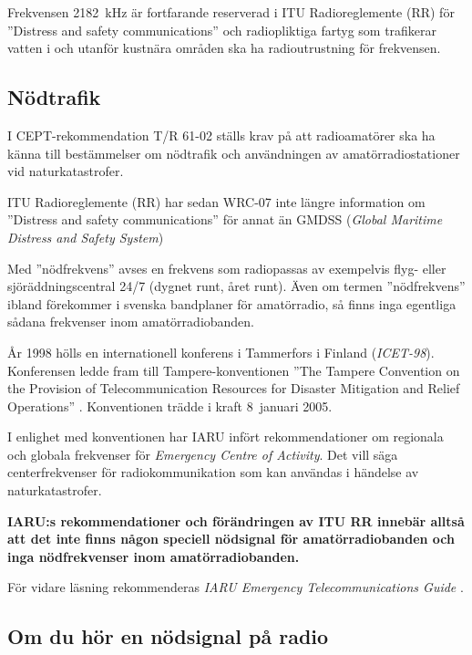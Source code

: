 Frekvensen 2182~kHz är fortfarande reserverad i ITU Radioreglemente (RR)
\cite{ITU-RR} för ''Distress and safety communications'' och radiopliktiga
fartyg som trafikerar vatten i och utanför kustnära områden ska ha
radioutrustning för frekvensen.

\subsection{Nödtrafik}
\label{nödtrafik}

I CEPT-rekommendation T/R 61-02 \cite{TR6102} ställs krav på att radioamatörer
ska ha känna till bestämmelser om nödtrafik och användningen av
amatörradiostationer vid naturkatastrofer.

ITU Radioreglemente (RR) \cite{ITU-RR} har sedan WRC-07 inte längre information
om ''Distress and safety communications'' för annat än
GMDSS (\emph{Global Maritime Distress and Safety System})

Med ''nödfrekvens'' avses en frekvens som radiopassas av exempelvis flyg- eller
sjöräddningscentral 24/7 (dygnet runt, året runt).
Även om termen ''nödfrekvens'' ibland förekommer i svenska bandplaner för
amatörradio, så finns inga egentliga sådana frekvenser inom amatörradiobanden.

År 1998 hölls en internationell konferens i Tammerfors i Finland
(\emph{ICET-98}).
Konferensen ledde fram till Tampere-konventionen ''The Tampere Convention on
the Provision of Telecommunication Resources for Disaster Mitigation and Relief
Operations'' \cite{TampereConvention}.
Konventionen trädde i kraft 8~januari 2005.

I enlighet med konventionen har IARU infört rekommendationer om regionala och
globala frekvenser för \emph{Emergency Centre of Activity}.
Det vill säga centerfrekvenser för radiokommunikation som kan användas i
händelse av naturkatastrofer.

\textbf{IARU:s rekommendationer och förändringen av ITU RR innebär alltså att
  det inte finns någon speciell nödsignal för amatörradiobanden och inga
  nödfrekvenser inom amatörradiobanden.}

För vidare läsning rekommenderas
\emph{IARU Emergency Telecommunications Guide} \cite{IARU-ETG}.

\subsection{Om du hör en nödsignal på radio}

